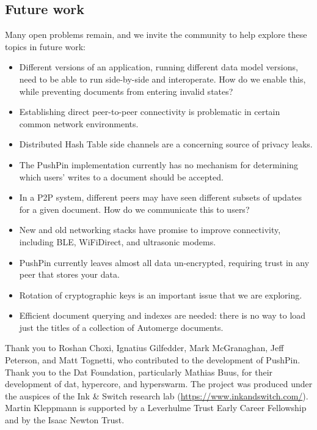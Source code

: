 \documentclass[sigplan,10pt]{acmart}
\begin{document}
\subsection{Future work}
Many open problems remain, and we invite the community to help explore these topics in future work:
\begin{itemize}
    \item Different versions of an application, running different data model versions, need to be able to run side-by-side and interoperate. How do we enable this, while preventing documents from entering invalid states?
    \item Establishing direct peer-to-peer connectivity is problematic in certain common network environments.
    \item Distributed Hash Table side channels are a concerning source of privacy leaks.
    \item The PushPin implementation currently has no mechanism for determining which users' writes to a document should be accepted.
    \item In a P2P system, different peers may have seen different subsets of updates for a given document. How do we communicate this to users?
    \item New and old networking stacks have promise to improve connectivity, including BLE, WiFiDirect, and ultrasonic modems.
    \item PushPin currently leaves almost all data un-encrypted, requiring trust in any peer that stores your data.
    \item Rotation of cryptographic keys is an important issue that we are exploring.
    \item Efficient document querying and indexes are needed: there is no way to load just the titles of a collection of Automerge documents.
\end{itemize}

\begin{acks}
Thank you to Roshan Choxi, Ignatius Gilfedder, Mark McGranaghan, Jeff Peterson, and Matt Tognetti, who contributed to the development of PushPin.
Thank you to the Dat Foundation, particularly Mathias Buus, for their development of dat, hypercore, and hyperswarm.
The project was produced under the auspices of the Ink \& Switch research lab (\url{https://www.inkandswitch.com/}).
Martin Kleppmann is supported by a Leverhulme Trust Early Career Fellowship and by the Isaac Newton Trust.
\end{acks}


{}
\end{document}
